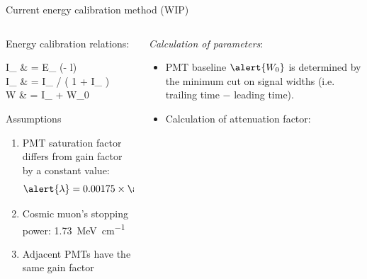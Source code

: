 \documentclass{ikpKoeln}
\begin{document}
\begin{frame}[t]{Current energy calibration method (WIP)}
	\vspace{-1em}
	\begin{columns}[t]
		\begin{column}{0.45 \textwidth}
			\vspace{-1em}
			\begin{alertblock}{\small Energy calibration relations:}
				\footnotesize{
					\setlength{\abovedisplayskip}{0pt}
					\setlength{\belowdisplayskip}{0pt}
					\setlength{\abovedisplayshortskip}{0pt}
					\setlength{\belowdisplayshortskip}{0pt}
					\begin{flalign}
						I_ & = E_ \cdot \exp(-\alert{\alpha} \cdot l)                           \\
						I_ & = I_ \cdot / \left( 1 + \alert{\lambda} \cdot I_ \right) \\
						W            & = \alert{} \cdot I_ + \alert{W_0}
					\end{flalign}
				}
			\end{alertblock}
			\begin{exampleblock}{\small Assumptions}
				\footnotesize{
					\begin{enumerate}
						\setlength\itemsep{0em}
						\item PMT saturation factor differs from gain factor by a constant value: \vspace{-1em}$$\alert{\lambda} = 0.00175 \times \alert{\mathcal{G}}$$
						\item \vspace{-1em}Cosmic muon's stopping power: \qty{1.73}{\mega\electronvolt\per\centi\metre}
						\item Adjacent PMTs have the same gain factor
					\end{enumerate}
				}
			\end{exampleblock}
		\end{column}
		\begin{column}{0.45 \textwidth}
			\textit{\footnotesize Calculation of parameters}:
			\small{
				\begin{itemize}
					\setlength\itemsep{0em}
					\item PMT baseline $\alert{W_0}$ is determined by the minimum cut on signal widths (i.e. trailing time $-$ leading time).
					\item Calculation of attenuation factor:

\end{itemize}}
\end{column}
\end{columns}
\end{frame}
\end{document}
